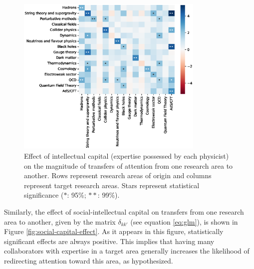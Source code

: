 \documentclass{article}
\begin{document}
\begin{figure}
    \centering
    \includegraphics[width=0.8\textwidth]{plots/ei_gamma_control.eps}
    \caption{Effect of intellectual capital (expertise possessed by each physicist) on the magnitude of transfers of attention from one research area to another. Rows represent research areas of origin and columns represent target research areas. Stars represent statistical significance ($\ast$: 95\%; $\ast\ast$: 99\%).}
    \label{fig:intellectual-capital-effect}
\end{figure}

Similarly, the effect of social-intellectual capital on transfers from one research area to another, given by the matrix $\delta_{kk'}$ (see equation \ref{eq:glm}), is shown in Figure \ref{fig:social-capital-effect}. As it appears in this figure, statistically significant effects are always positive. This implies that having many collaborators with expertise in a target area generally increases the likelihood of redirecting attention toward this area, as hypothesized. 
\end{document}

